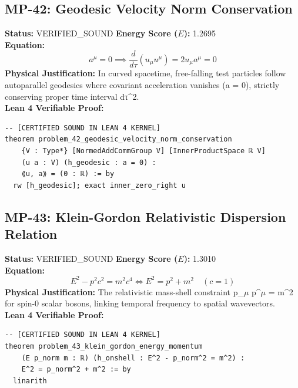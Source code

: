 \documentclass[11pt, a4paper]{article}
\begin{document}
\subsection{MP-42: Geodesic Velocity Norm Conservation}
\textbf{Status:} VERIFIED\_SOUND \hfill \textbf{Energy Score ($E$):} 1.2695\\
\textbf{Equation:}
\begin{equation*}
a^\mu = 0 \implies \frac{d}{d\tau}(u_\mu u^\mu) = 2 u_\mu a^\mu = 0
\end{equation*}
\textbf{Physical Justification:} In curved spacetime, free-falling test particles follow autoparallel geodesics where covariant acceleration vanishes (a = 0), strictly conserving proper time interval dτ\textasciicircum{}2.\\
\textbf{Lean 4 Verifiable Proof:}
\begin{verbatim}
-- [CERTIFIED SOUND IN LEAN 4 KERNEL]
theorem problem_42_geodesic_velocity_norm_conservation
    {V : Type*} [NormedAddCommGroup V] [InnerProductSpace ℝ V]
    (u a : V) (h_geodesic : a = 0) :
    ⟪u, a⟫ = (0 : ℝ) := by
  rw [h_geodesic]; exact inner_zero_right u

\end{verbatim}

\subsection{MP-43: Klein-Gordon Relativistic Dispersion Relation}
\textbf{Status:} VERIFIED\_SOUND \hfill \textbf{Energy Score ($E$):} 1.3010\\
\textbf{Equation:}
\begin{equation*}
E^2 - p^2 c^2 = m^2 c^4 \iff E^2 = p^2 + m^2 \quad (c=1)
\end{equation*}
\textbf{Physical Justification:} The relativistic mass-shell constraint p\_$\mu$ p\textasciicircum{}$\mu$ = m\textasciicircum{}2 for spin-0 scalar bosons, linking temporal frequency to spatial wavevectors.\\
\textbf{Lean 4 Verifiable Proof:}
\begin{verbatim}
-- [CERTIFIED SOUND IN LEAN 4 KERNEL]
theorem problem_43_klein_gordon_energy_momentum
    (E p_norm m : ℝ) (h_onshell : E^2 - p_norm^2 = m^2) :
    E^2 = p_norm^2 + m^2 := by
  linarith

\end{verbatim}
\end{document}
